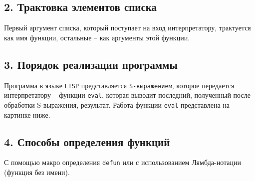 \documentclass[12pt]{report}
\begin{document}
\subsection*{2. Трактовка элементов списка}

Первый аргумент списка, который поступает на вход интерпретатору, трактуется как имя функции, остальные -- как аргументы этой функции.

\subsection*{3. Порядок реализации программы}

Программа в языке \texttt{LISP} представляется \texttt{S-выражением}, которое передается интерпретатору -- функции \texttt{eval}, которая выводит последний, полученный после обработки S-выражения, результат.
Работа функции \texttt{eval} представлена на картинке ниже.

\subsection*{4. Способы определения функций}

С помощью макро определения \texttt{defun} или с использованием Лямбда-нотации (функция без имени).
	
	
	
\end{document}
